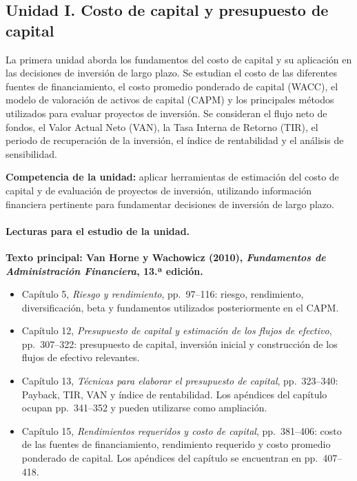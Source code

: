 \documentclass[12pt,a4paper]{article}
\begin{document}
\subsection{Unidad I. Costo de capital y presupuesto de capital}

La primera unidad aborda los fundamentos del costo de capital y su aplicación
en las decisiones de inversión de largo plazo. Se estudian el costo de las
diferentes fuentes de financiamiento, el costo promedio ponderado de capital
(WACC), el modelo de valoración de activos de capital (CAPM) y los principales
métodos utilizados para evaluar proyectos de inversión. Se consideran el flujo
neto de fondos, el Valor Actual Neto (VAN), la Tasa Interna de Retorno (TIR),
el periodo de recuperación de la inversión, el índice de rentabilidad y el
análisis de sensibilidad.
\parencite{uaProgramaFinanzasLargoPlazo}

\textbf{Competencia de la unidad:} aplicar herramientas de estimación del
costo de capital y de evaluación de proyectos de inversión, utilizando
información financiera pertinente para fundamentar decisiones de inversión
de largo plazo.

\paragraph{Lecturas para el estudio de la unidad.}

\textbf{Texto principal: Van Horne y Wachowicz (2010),
\textit{Fundamentos de Administración Financiera}, 13.ª edición.}

\begin{itemize}
    \item Capítulo 5, \textit{Riesgo y rendimiento},
    pp.~97--116: riesgo, rendimiento, diversificación, beta y fundamentos
    utilizados posteriormente en el CAPM.

    \item Capítulo 12, \textit{Presupuesto de capital y estimación de los
    flujos de efectivo}, pp.~307--322: presupuesto de capital, inversión
    inicial y construcción de los flujos de efectivo relevantes.

    \item Capítulo 13, \textit{Técnicas para elaborar el presupuesto de
    capital}, pp.~323--340: Payback, TIR, VAN y
    índice de rentabilidad. Los apéndices del capítulo ocupan
    pp.~341--352 y pueden utilizarse como ampliación.

    \item Capítulo 15, \textit{Rendimientos requeridos y costo de capital},
    pp.~381--406: costo de las fuentes de financiamiento, rendimiento
    requerido y costo promedio ponderado de capital. Los apéndices del
    capítulo se encuentran en pp.~407--418.
\end{itemize}
\end{document}
